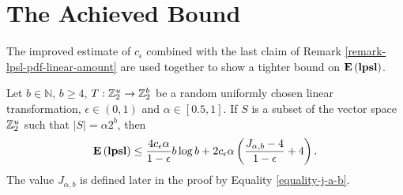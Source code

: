 \section{The Achieved Bound}

The improved estimate of $c_\epsilon$ combined with the last claim of Remark \ref{remark-lpsl-pdf-linear-amount} are used together to show a tighter bound on $\mathbf{E}\left(\mathbf{lpsl}\right)$.

\begin{theorem}
\label{theorem-hashing-linear-amount}
Let $b \in \mathbb{N}$, $b \geq 4$, $T: \mathbb{Z}_{2}^{u} \rightarrow \mathbb{Z}_{2}^{b}$ be a random uniformly chosen linear transformation, $\epsilon \in (0, 1)$ and $\alpha \in \left[0.5, 1\right]$. If $S$ is a subset of the vector space $\mathbb{Z}_{2}^{u}$ such that $|S| = \alpha 2 ^ b$, then \[ \mathbf{E}\left(\mathbf{lpsl}\right) \leq \frac{4 c_\epsilon \alpha}{1 - \epsilon} b \log b + 2 c_\epsilon \alpha \left( \frac{J_{\alpha, b} - 4}{1 - \epsilon} + 4 \right) \text{.} \] The value $J_{\alpha, b}$ is defined later in the proof by Equality \ref{equality-j-a-b}.
\end{theorem}
